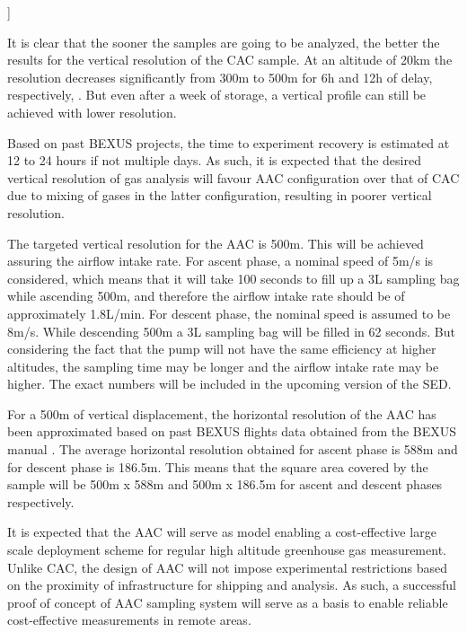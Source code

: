 ]\documentclass[a4paper,12pt,twoside]{article}
\begin{document}
It is clear that the sooner the samples are going to be analyzed, the better the results for the vertical resolution of the CAC sample. At an altitude of 20km the resolution decreases significantly from 300m to 500m for 6h and 12h of delay, respectively, \cite{Olivier}. But even after a week of storage, a vertical profile can still be achieved with lower resolution.

Based on past BEXUS projects, the time to experiment recovery is estimated at 12 to 24 hours if not multiple days. As such, it is expected that the desired vertical resolution of gas analysis will favour AAC configuration over that of CAC due to mixing of gases in the latter configuration, resulting in poorer vertical resolution.



The targeted vertical resolution for the AAC is 500m. This will be achieved assuring the airflow intake rate. For ascent phase, a nominal speed of 5m/s is considered, which means that it will take 100 seconds to fill up a 3L sampling bag while ascending 500m, and therefore the airflow intake rate should be of approximately 1.8L/min. For descent phase, the nominal speed is assumed to be 8m/s. While descending 500m a 3L sampling bag will be filled in 62 seconds.
But considering the fact that the pump will not have the same efficiency at higher altitudes, the sampling time may be longer and the airflow intake rate may be higher. The exact numbers will be included in the upcoming version of the SED.  

For a 500m of vertical displacement, the horizontal resolution of the AAC has been approximated based on past BEXUS flights data obtained from the BEXUS manual \cite{BexusManual}. The average horizontal resolution obtained for ascent phase is 588m and for descent phase is 186.5m. This means that the square area covered by the sample will be 500m x 588m and 500m x 186.5m for ascent and descent phases respectively.



It is expected that the AAC will serve as model enabling a cost-effective large scale deployment scheme for regular high altitude greenhouse gas measurement. Unlike CAC, the design of AAC will not impose experimental restrictions based on the proximity of infrastructure for shipping and analysis. As such, a successful proof of concept of AAC sampling system will serve as a basis to enable reliable cost-effective measurements in remote areas.
\end{document}
